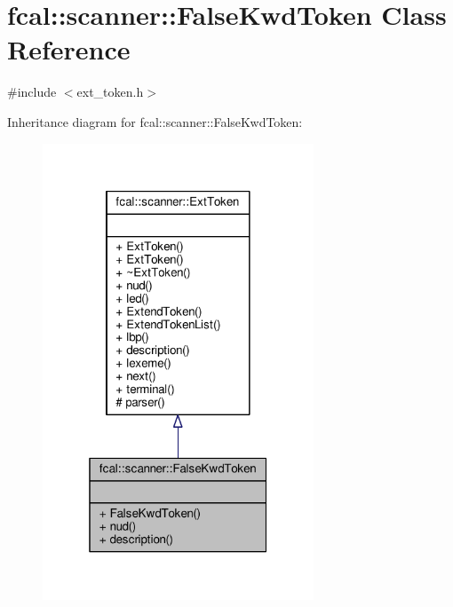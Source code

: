 \hypertarget{classfcal_1_1scanner_1_1FalseKwdToken}{}\section{fcal\+:\+:scanner\+:\+:False\+Kwd\+Token Class Reference}
\label{classfcal_1_1scanner_1_1FalseKwdToken}


{\ttfamily \#include $<$ext\+\_\+token.\+h$>$}



Inheritance diagram for fcal\+:\+:scanner\+:\+:False\+Kwd\+Token\+:
\nopagebreak
\begin{figure}[H]
\begin{center}
\leavevmode
\includegraphics[width=229pt]{classfcal_1_1scanner_1_1FalseKwdToken__inherit__graph}
\end{center}
\end{figure}


